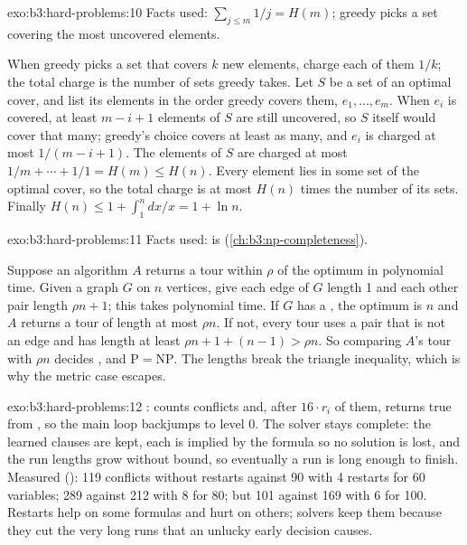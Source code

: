 \begin{solution}{exo:b3:hard-problems:10}
Facts used: $\sum_{j \le m} 1/j = H(m)$; greedy picks a set covering the most uncovered elements.

When greedy picks a set that covers $k$ new elements, charge each of them $1/k$; the total charge is the number of sets greedy takes. Let $S$ be a set of an optimal cover, and list its elements in the order greedy covers them, $e_1, \ldots, e_m$. When $e_i$ is covered, at least $m - i + 1$ elements of $S$ are still uncovered, so $S$ itself would cover that many; greedy's choice covers at least as many, and $e_i$ is charged at most $1/(m - i + 1)$. The elements of $S$ are charged at most $1/m + \cdots + 1/1 = H(m) \le H(n)$. Every element lies in some set of the optimal cover, so the total charge is at most $H(n)$ times the number of its sets. Finally $H(n) \le 1 + \int_1^n dx/x = 1 + \ln n$.
\end{solution}

\begin{solution}{exo:b3:hard-problems:11}
Facts used:  is  (\cref{ch:b3:np-completeness}).

Suppose an algorithm $A$ returns a tour within $\rho$ of the optimum in polynomial time. Given a graph $G$ on $n$ vertices, give each edge of $G$ length 1 and each other pair length $\rho n + 1$; this takes polynomial time. If $G$ has a , the optimum is $n$ and $A$ returns a tour of length at most $\rho n$. If not, every tour uses a pair that is not an edge and has length at least $\rho n + 1 + (n - 1) > \rho n$. So comparing $A$'s tour with $\rho n$ decides , and $\mathrm{P} = \mathrm{NP}$. The lengths break the triangle inequality, which is why the metric case escapes.
\end{solution}

\begin{solution}{exo:b3:hard-problems:12}
:  counts conflicts and, after $16 \cdot r_i$ of them, returns true from , so the main loop backjumps to level 0. The solver stays complete: the learned clauses are kept, each is implied by the formula so no solution is lost, and the run lengths grow without bound, so eventually a run is long enough to finish. Measured (): 119 conflicts without restarts against 90 with 4 restarts for 60 variables; 289 against 212 with 8 for 80; but 101 against 169 with 6 for 100. Restarts help on some formulas and hurt on others; solvers keep them because they cut the very long runs that an unlucky early decision causes.
\end{solution}

